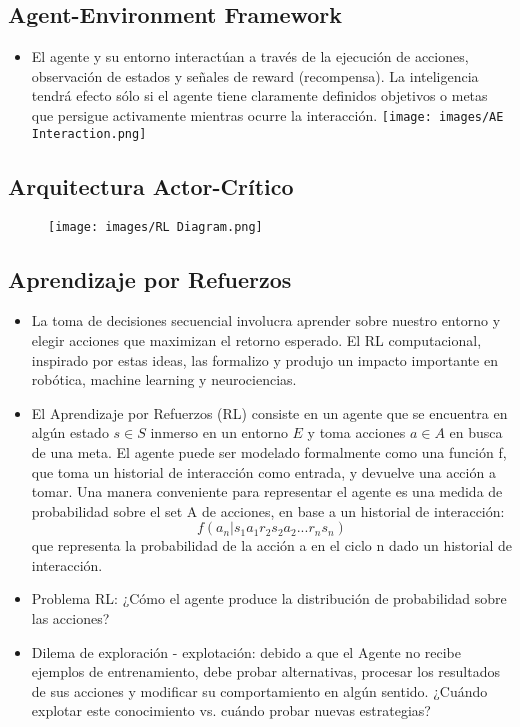 \documentclass[11pt]{article}
\makeatletter
\def\maxwidth{\ifdim\Gin@nat@width>\linewidth\linewidth
    \else\Gin@nat@width\fi}
\let\Oldincludegraphics\includegraphics
\renewcommand{\includegraphics}[1]{\Oldincludegraphics[width=.8\maxwidth]{#1}}
\providecommand{\tightlist}{%
      \setlength{\itemsep}{0pt}\setlength{\parskip}{0pt}}
\makeatother
\begin{document}
    \subsection{Agent-Environment
Framework}\label{agent-environment-framework}

\begin{itemize}
\tightlist
\item
  El agente y su entorno interactúan a través de la ejecución de
  acciones, observación de estados y señales de reward (recompensa). La
  inteligencia tendrá efecto sólo si el agente tiene claramente
  definidos objetivos o metas que persigue activamente mientras ocurre
  la interacción. \texttt{[image: images/AE Interaction.png]}
\end{itemize}

    \subsection{Arquitectura
Actor-Crítico}\label{arquitectura-actor-cruxedtico}

\begin{figure}
\centering
\texttt{[image: images/RL Diagram.png]}
\caption{}
\end{figure}

    \subsection{Aprendizaje por Refuerzos}\label{aprendizaje-por-refuerzos}

\begin{itemize}
\item
  La toma de decisiones secuencial involucra aprender sobre nuestro
  entorno y elegir acciones que maximizan el retorno esperado. El RL
  computacional, inspirado por estas ideas, las formalizo y produjo un
  impacto importante en robótica, machine learning y neurociencias.
\item
  El Aprendizaje por Refuerzos (RL) consiste en un agente que se
  encuentra en algún estado \(s \in S\) inmerso en un entorno \(E\) y
  toma acciones \(a \in A\) en busca de una meta. El agente puede ser
  modelado formalmente como una función f, que toma un historial de
  interacción como entrada, y devuelve una acción a tomar. Una manera
  conveniente para representar el agente es una medida de probabilidad
  sobre el set A de acciones, en base a un historial de interacción:
  \[ f(a_{n}|s_{1}a_{1} r_{2} s_{2}a_{2}...r_{n}s_{n}) \] que representa
  la probabilidad de la acción a en el ciclo n dado un historial de
  interacción.
\item
  Problema RL: ¿Cómo el agente produce la distribución de probabilidad
  sobre las acciones?
\item
  Dilema de exploración - explotación: debido a que el Agente no recibe
  ejemplos de entrenamiento, debe probar alternativas, procesar los
  resultados de sus acciones y modificar su comportamiento en algún
  sentido. ¿Cuándo explotar este conocimiento vs. cuándo probar nuevas
  estrategias?
\end{itemize}
\end{document}
